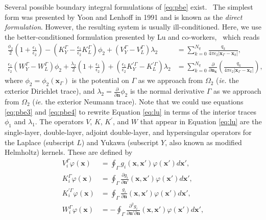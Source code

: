 Several possible boundary integral formulations of \eqref{eq:pbe} exist.~\cite{search2022towards} The simplest form was presented by Yoon and Lenhoff in 1991\cite{YoonLenhoff1990} and is known as the \emph{direct formulation}. However, the resulting system is usually ill-conditioned. Here, we use the better-conditioned formulation presented by Lu and co-workers,~\cite{LuETal2006,LuETal2009,debuhr2016dashmm} which reads
%
\begin{align}\label{eq:lu}
    \tfrac{\phi_2}{2}\left(1+\tfrac{\epsilon_1}{\epsilon_2}\right) - \left(K_Y^\Gamma - \tfrac{\epsilon_1}{\epsilon_2}K_L^\Gamma\right)\phi_2 + \left(V_Y^\Gamma - V_L^\Gamma\right)\lambda_2 &= \sum_{k=0}^{N_q}  \frac{q_k}{4\pi\epsilon_2|\mathbf{x}_{\Gamma} - \mathbf{x}_k|},
     \nonumber \\
    \tfrac{\epsilon_1}{\epsilon_2}\left(W_Y^\Gamma - W_L^\Gamma\right)\phi_2 +  \tfrac{\lambda_2}{2}\left(1+\tfrac{\epsilon_1}{\epsilon_2}\right) + \left(\tfrac{\epsilon_1}{\epsilon_2}K_Y^{\prime\Gamma} - K_L^{\prime\Gamma}\right)\lambda_2 &= \sum_{k=0}^{N_q}  \frac{\partial}{\partial\mathbf{n}_\mathbf{x}}\left(\frac{q_k}{4\pi\epsilon_2|\mathbf{x}_{\Gamma} - \mathbf{x}_k|}\right),
\end{align}
where $\phi_2 = \phi_2(\mathbf{x}_\Gamma)$ is the potential on $\Gamma$ as we approach from $\Omega_2$ ({\it ie.} the exterior Dirichlet trace),
and $\lambda_2 = \frac{\partial}{\partial \mathbf{n}}\phi_2$ is the normal derivative $\Gamma$ as we approach from $\Omega_2$ ({\it ie.} the exterior Neumann trace).
Note that we could use equations \eqref{eq:pbe3} and \eqref{eq:pbe4} to rewrite Equation \eqref{eq:lu} in terms of the interior traces $\phi_1$ and $\lambda_1$.
The operators $V$, $K$, $K^{\prime}$, and $W$ that appear in Equation \eqref{eq:lu} are the single-layer, double-layer, adjoint double-layer, and hypersingular operators for the Laplace (subscript $L$) and Yukawa (subscript $Y$, also known as modified Helmholtz) kernels. These are defined %
by
%
\begin{align}\label{eq:all_op}
V_i^\Gamma \varphi (\mathbf{x}) &= \oint_\Gamma g_i(\mathbf{x},\mathbf{x}')\varphi(\mathbf{x}')d\mathbf{x}',\nonumber\\
K_i^\Gamma \varphi (\mathbf{x}) &= \oint_\Gamma \frac{\partial g_i}{\partial\mathbf{n}'}(\mathbf{x},\mathbf{x}')\varphi(\mathbf{x}')d\mathbf{x}',\nonumber\\
K^{\prime\Gamma}_i\varphi (\mathbf{x}) &= \oint_\Gamma \frac{g_i}{\partial\mathbf{n}}(\mathbf{x},\mathbf{x}')\varphi(\mathbf{x}')d\mathbf{x}',\nonumber\\
W^\Gamma_i\varphi (\mathbf{x}) &= - \oint_\Gamma \frac{\partial^2 g_i}{\partial\mathbf{n}'\partial\mathbf{n}}(\mathbf{x},\mathbf{x}')\varphi(\mathbf{x}')d\mathbf{x}',
\end{align}
